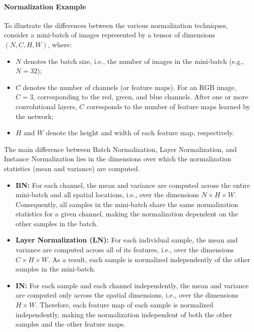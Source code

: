\paragraph{Normalization Example}
To illustrate the differences between the various normalization techniques, consider a mini-batch of images represented by a tensor of dimensions $(N, C, H, W)$, where:
\begin{itemize}
    \item $N$ denotes the batch size, i.e., the number of images in the mini-batch (e.g., $N = 32$);
    \item $C$ denotes the number of channels (or feature maps). For an RGB image, $C = 3$, corresponding to the red, green, and blue channels.
    After one or more convolutional layers, $C$ corresponds to the number of feature maps learned by the network;
    \item $H$ and $W$ denote the height and width of each feature map, respectively.
\end{itemize}

The main difference between Batch Normalization, Layer Normalization, and Instance Normalization lies in the dimensions over which the normalization statistics (mean and variance) are computed.
\begin{itemize}
    \item \textbf{BN:} For each channel, the mean and variance are computed across the entire mini-batch and all spatial locations, i.e., over the dimensions $N \times H \times W$. Consequently, all samples in the mini-batch share the same normalization statistics for a given channel, making the normalization dependent on the other samples in the batch.

    \item \textbf{Layer Normalization (LN):} For each individual sample, the mean and variance are computed across all of its features, i.e., over the dimensions $C \times H \times W$. As a result, each sample is normalized independently of the other samples in the mini-batch.

    \item \textbf{IN:} For each sample and each channel independently, the mean and variance are computed only across the spatial dimensions, i.e., over the dimensions $H \times W$. Therefore, each feature map of each sample is normalized independently, making the normalization independent of both the other samples and the other feature maps.
\end{itemize}
